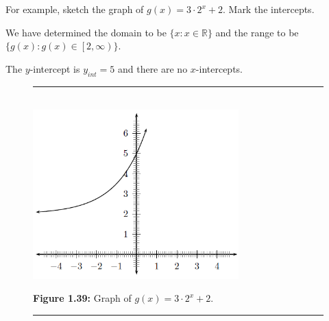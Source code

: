           \label{m39348*id252808}For example, sketch the graph of \begin{math}g\left(x\right)=3\ensuremath{\cdot}{2}^{x}+2\end{math}. Mark the intercepts.\par 
          \label{m39348*id252849}We have determined the domain to be \begin{math}\{x:x\in \mathbb{R}\}\end{math} and the range to be \begin{math}\{g\left(x\right):g\left(x\right)\in \left[2,\infty \right)\}\end{math}.\par 
          \label{m39348*id252925}The \begin{math}y\end{math}-intercept is \begin{math}{y}_{int}=5\end{math} and there are no \begin{math}x\end{math}-intercepts.\par 
          
    \setcounter{subfigure}{0}


	\begin{figure}[H] %
    \begin{center}
    \rule[.1in]{\figurerulewidth}{.005in} \\
        \label{m39348*uid196!!!underscore!!!media}\label{m39348*uid196!!!underscore!!!printimage}\includegraphics[width=300px]{col11306.imgs/m39348_MG10C11_032.png} %
        
      \vspace{2pt}
    \vspace{\rubberspace}\par \begin{cnxcaption}
	  \small \textbf{Figure 1.39: }Graph of \begin{math}g\left(x\right)=3\ensuremath{\cdot}{2}^{x}+2\end{math}.
	\end{cnxcaption}
      
    \vspace{.1in}
    \rule[.1in]{\figurerulewidth}{.005in} \\
        
    \end{center}

 \end{figure}   

